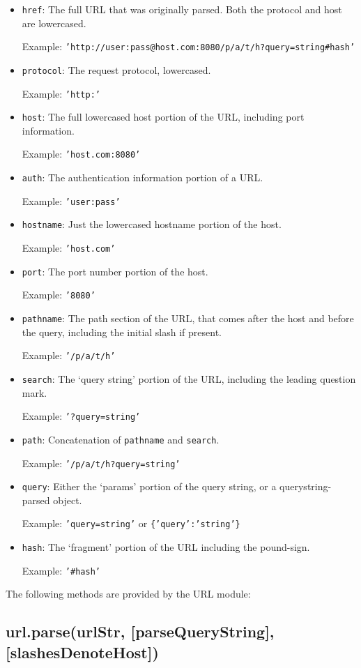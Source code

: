 \begin{itemize}
\item
  \texttt{href}: The full URL that was originally parsed. Both the
  protocol and host are lowercased.

  Example:
  \texttt{'http://user:pass@host.com:8080/p/a/t/h?query=string\#hash'}
\item
  \texttt{protocol}: The request protocol, lowercased.

  Example: \texttt{'http:'}
\item
  \texttt{host}: The full lowercased host portion of the URL, including
  port information.

  Example: \texttt{'host.com:8080'}
\item
  \texttt{auth}: The authentication information portion of a URL.

  Example: \texttt{'user:pass'}
\item
  \texttt{hostname}: Just the lowercased hostname portion of the host.

  Example: \texttt{'host.com'}
\item
  \texttt{port}: The port number portion of the host.

  Example: \texttt{'8080'}
\item
  \texttt{pathname}: The path section of the URL, that comes after the
  host and before the query, including the initial slash if present.

  Example: \texttt{'/p/a/t/h'}
\item
  \texttt{search}: The `query string' portion of the URL, including the
  leading question mark.

  Example: \texttt{'?query=string'}
\item
  \texttt{path}: Concatenation of \texttt{pathname} and \texttt{search}.

  Example: \texttt{'/p/a/t/h?query=string'}
\item
  \texttt{query}: Either the `params' portion of the query string, or a
  querystring-parsed object.

  Example: \texttt{'query=string'} or \texttt{\{'query':'string'\}}
\item
  \texttt{hash}: The `fragment' portion of the URL including the
  pound-sign.

  Example: \texttt{'\#hash'}
\end{itemize}

The following methods are provided by the URL module:

\subsection{url.parse(urlStr, {[}parseQueryString{]},
{[}slashesDenoteHost{]})}\label{url.parseurlstr-parsequerystring-slashesdenotehost}

